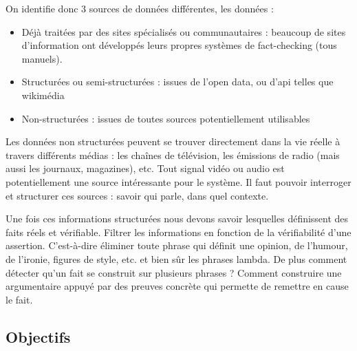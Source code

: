 On identifie donc 3 sources de données différentes, les données : 

\begin{itemize}
    \item Déjà traitées par des sites spécialisés ou communautaires : beaucoup de sites d'information ont développés leurs propres systèmes de fact-checking (tous manuels). 
    \item Structurées ou semi-structurées : issues de l'open data, ou d'api telles que wikimédia
    \item Non-structurées : issues de toutes sources potentiellement utilisables
\end{itemize}

Les données non structurées peuvent se trouver directement dans la vie réelle à travers différents médias : les chaînes de télévision, les émissions de radio (mais aussi les journaux, magazines), etc. Tout signal vidéo ou audio est potentiellement une source intéressante pour le système. Il faut pouvoir interroger et structurer ces sources : savoir qui parle, dans quel contexte.

Une fois ces informations structurées nous devons savoir lesquelles définissent des faits réels et vérifiable. Filtrer les informations en fonction de la vérifiabilité d'une assertion. C'est-à-dire éliminer toute phrase qui définit une opinion, de l'humour, de l'ironie, figures de style, etc. et bien sûr les phrases lambda. De plus comment détecter qu'un fait se construit sur plusieurs phrases ? Comment construire une argumentaire appuyé par des preuves concrète qui permette de remettre en cause le fait.

\subsection{Objectifs}


